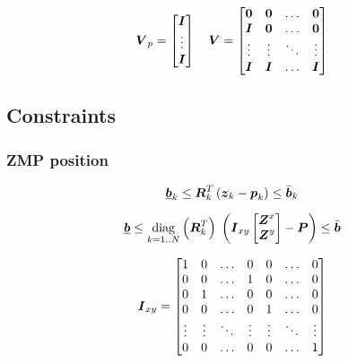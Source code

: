 \begin{equation*}
    \mbox{\boldmath $V$}_p = 
    \begin{bmatrix}
        \mbox{\boldmath $I$}\\
        \vdots\\
        \mbox{\boldmath $I$}\\
    \end{bmatrix}
    \quad
    \mbox{\boldmath $V$} = 
    \begin{bmatrix}
        \mbox{\boldmath $0$}   &   \mbox{\boldmath $0$}   & \dots     & \mbox{\boldmath $0$} \\
        \mbox{\boldmath $I$}   &   \mbox{\boldmath $0$}   & \dots     & \mbox{\boldmath $0$} \\
        \vdots  &   \vdots  & \ddots    & \vdots \\
        \mbox{\boldmath $I$}   &   \mbox{\boldmath $I$}   & \dots     & \mbox{\boldmath $I$} \\
    \end{bmatrix}
\end{equation*}



\subsection{Constraints}

\subsubsection{ZMP position}
\begin{equation*}
    \underline{\mbox{\boldmath $b$}}_k \le \mbox{\boldmath $R$}_k^T \left( \mbox{\boldmath $z$}_k - \mbox{\boldmath $p$}_k \right) \le \bar{\mbox{\boldmath $b$}}_k\\
\end{equation*}

\begin{equation*}
    \underbar{\mbox{\boldmath $b$}} 
    \le 
    \underset{k = 1..N}{\operatorname{diag}}\left(\mbox{\boldmath $R$}_k^T\right)\;
    \left(
        \mbox{\boldmath $I$}_{xy} 
        \begin{bmatrix} \mbox{\boldmath $Z$}^x \\ \mbox{\boldmath $Z$}^y \end{bmatrix} 
        -
        \mbox{\boldmath $P$}
    \right) 
    \le
    \bar{\mbox{\boldmath $b$}}
\end{equation*}

\begin{equation*}
    \mbox{\boldmath $I$}_{xy} =
    \begin{bmatrix}
        1       &   0   & \dots &   0   &   0   & \dots &   0  \\
        0       &   0   & \dots &   1   &   0   & \dots &   0  \\
        0       &   1   & \dots &   0   &   0   & \dots &   0  \\
        0       &   0   & \dots &   0   &   1   & \dots &   0  \\
        \vdots  &\vdots &\ddots &\vdots &\vdots &\ddots &\vdots\\
        0       &   0   & \dots &   0   &   0   & \dots &   1  \\
    \end{bmatrix}
\end{equation*}
